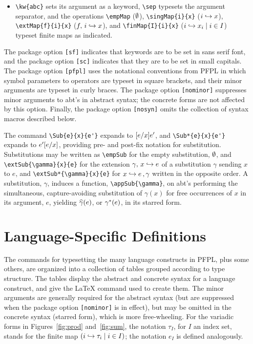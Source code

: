 \documentclass[11pt]{article}
\begin{document}
\begin{itemize}
  \item \verb|\kw{abc}| sets its argument as a keyword, \verb|\sep| typesets the argument separator, and the operations \verb|\empMap| ($\empMap$), \verb|\singMap{i}{x}| ($\singMap{i}{x}$), \verb|\extMap{f}{i}{x}| ($\extMap{f}{i}{x}$), and \verb|\finMap{I}{i}{x}| ($\finMap{I}{i}{x}$) typeset finite maps as indicated.
\end{itemize}

The package option \verb|[sf]| indicates that keywords are to be set in sans serif font, and the package option \verb|[sc]| indicates that they are to be set in small capitals.  The package option \verb|[pfpl]| uses the notational conventions from \textsf{PFPL} in which symbol parameters to operators are typeset in square brackets, and their minor arguments are typeset in curly braces.  The package option \verb|[nominor]| suppresses minor arguments to abt's in abstract syntax; the concrete forms are not affected by this option.  Finally, the package option \verb|[nosyn]| omits the collection of syntax macros described below.

\smallskip

The command \verb|\Sub{e}{x}{e'}| expands to $\Sub{e}{x}{e'}$, and \verb|\Sub*{e}{x}{e'}| expands to $\Sub*{e}{x}{e'}$, providing pre- and post-fix notation for substitution.  Substitutions may be written as \verb|\empSub| for the empty substitution, $\empSub$, and \verb|\extSub{\gamma}{x}{e}| for the extension $\extSub{\gamma}{x}{e}$ of a substitution $\gamma$ sending $x$ to $e$, and \verb|\extSub*{\gamma}{x}{e}| for $\extSub*{\gamma}{x}{e}$ written in the opposite order.  A substitution, $\gamma$, induces a function, \verb|\appSub{\gamma}|, on abt's performing the simultaneous, capture-avoiding substitution of $\gamma(x)$ for free occurrences of $x$ in its argument, $e$, yielding $\appSub{\gamma}(e)$, or $\appSub*{\gamma}(e)$, in its starred form.

\clearpage

\section*{Language-Specific Definitions}
\label{sec:lang-defns}

The commands for typesetting the many language constructs in \textsf{PFPL}, plus some others, are organized into a collection of tables grouped according to type structure.  The tables display the abstract and concrete syntax for a language construct, and give the \LaTeX{} command used to create them.  The minor arguments are generally required for the abstract syntax (but are suppressed when the package option \verb|[nominor]| is in effect), but may be omitted in the concrete syntax (starred form), which is more free-wheeling.  For the variadic forms in Figures~\ref{fig:prod} and~\ref{fig:sum}, the notation $\tau_I$, for $I$ an index set, stands for the finite map $(\finMap{I}{i}{\tau})$; the notation $e_I$ is defined analogously.
\end{document}
